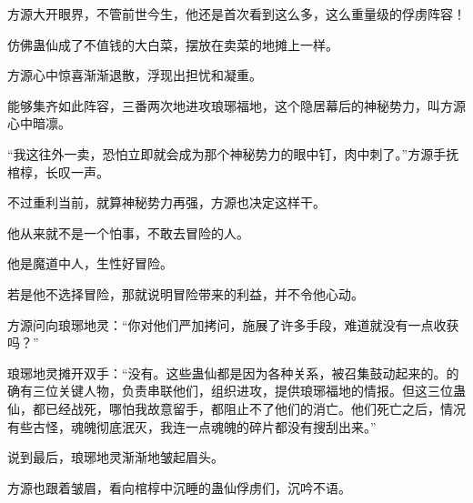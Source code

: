 \begin{this_body}
方源大开眼界，不管前世今生，他还是首次看到这么多，这么重量级的俘虏阵容！

仿佛蛊仙成了不值钱的大白菜，摆放在卖菜的地摊上一样。

方源心中惊喜渐渐退散，浮现出担忧和凝重。

能够集齐如此阵容，三番两次地进攻琅琊福地，这个隐居幕后的神秘势力，叫方源心中暗凛。

“我这往外一卖，恐怕立即就会成为那个神秘势力的眼中钉，肉中刺了。”方源手抚棺椁，长叹一声。

不过重利当前，就算神秘势力再强，方源也决定这样干。

他从来就不是一个怕事，不敢去冒险的人。

他是魔道中人，生性好冒险。

若是他不选择冒险，那就说明冒险带来的利益，并不令他心动。

方源问向琅琊地灵：“你对他们严加拷问，施展了许多手段，难道就没有一点收获吗？”

琅琊地灵摊开双手：“没有。这些蛊仙都是因为各种关系，被召集鼓动起来的。的确有三位关键人物，负责串联他们，组织进攻，提供琅琊福地的情报。但这三位蛊仙，都已经战死，哪怕我故意留手，都阻止不了他们的消亡。他们死亡之后，情况有些古怪，魂魄彻底泯灭，我连一点魂魄的碎片都没有搜刮出来。”

说到最后，琅琊地灵渐渐地皱起眉头。

方源也跟着皱眉，看向棺椁中沉睡的蛊仙俘虏们，沉吟不语。

\end{this_body}

